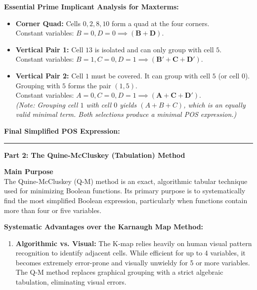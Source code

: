 \documentclass[12pt,a3paper]{article}
\begin{document}
\begin{enumerate}
\begin{tcolorbox}[enhanced,breakable,ansbox,colback=cC!4,colframe=cC,boxrule=0.8pt,arc=5pt,title={\textbf{Answer}},fonttitle=\bfseries\color{white},colbacktitle=cC]
\textbf{Essential Prime Implicant Analysis for Maxterms:}
\begin{itemize}
    \item \textbf{Corner Quad:} Cells $0, 2, 8, 10$ form a quad at the four corners. \\
    Constant variables: $B=0, D=0 \implies \mathbf{(B + D)}$.
    \item \textbf{Vertical Pair 1:} Cell $13$ is isolated and can only group with cell $5$. \\
    Constant variables: $B=1, C=0, D=1 \implies \mathbf{(B' + C + D')}$.
    \item \textbf{Vertical Pair 2:} Cell $1$ must be covered. It can group with cell $5$ (or cell $0$). Grouping with $5$ forms the pair $(1, 5)$. \\
    Constant variables: $A=0, C=0, D=1 \implies \mathbf{(A + C + D')}$. \\
    \textit{(Note: Grouping cell $1$ with cell $0$ yields $(A+B+C)$, which is an equally valid minimal term. Both selections produce a minimal POS expression.)}
\end{itemize}

\vspace{0.5em}
\textbf{Final Simplified POS Expression:}
\begin{center}
\end{center}

\vspace{1.5em}
\rule{\textwidth}{0.4pt}
\vspace{1.5em}

\textbf{\large Part 2: The Quine-McCluskey (Tabulation) Method}

\vspace{0.5em}
\textbf{Main Purpose} \\
The Quine-McCluskey (Q-M) method is an exact, algorithmic tabular technique used for minimizing Boolean functions. Its primary purpose is to systematically find the most simplified Boolean expression, particularly when functions contain more than four or five variables.

\vspace{0.5em}
\textbf{Systematic Advantages over the Karnaugh Map Method:}

\begin{enumerate}
    \item \textbf{Algorithmic vs. Visual:} 
    The K-map relies heavily on human visual pattern recognition to identify adjacent cells. While efficient for up to 4 variables, it becomes extremely error-prone and visually unwieldy for 5 or more variables. The Q-M method replaces graphical grouping with a strict algebraic tabulation, eliminating visual errors.
    

\end{enumerate}
\end{tcolorbox}
\end{enumerate}
\end{document}
